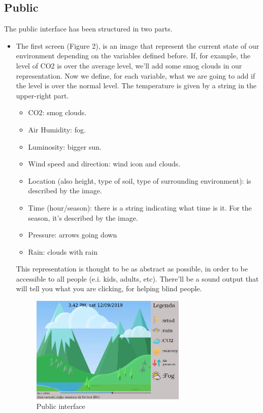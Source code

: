 \documentclass[12pt]{article} %
\begin{document}
\subsection{Public}
The public interface has been structured in two parts. 
\begin{itemize}
\item The first screen (Figure 2), is an image that represent the current state of our  environment depending on the variables defined before. If, for example, the level of CO2 is over the average level, we'll add some smog clouds in our representation. Now we define, for each variable, what we are going to add if the level is over the normal level. The temperature is given by a string in the upper-right part.
\begin{itemize}
\item CO2: smog clouds.
\item Air Humidity: fog.
\item Luminosity: bigger sun.
\item Wind speed and direction: wind icon and clouds.
\item Location (also height, type of soil, type of surrounding environment): is described by the image.
\item Time (hour/season): there is a string indicating what time is it. For the season, it's described by the image.
\item Pressure: arrows going down
\item Rain: clouds with rain
\end{itemize} 

This representation is thought to be as abstract as possible, in order to be accessible to all people (e.i. kids, adults, etc).
There'll be a sound output that will tell you what you are clicking, for helping blind people.

\begin{figure}[H]
  \centering
  \includegraphics[width=0.7\textwidth]{img/default.png}
  \caption{Public interface}
  \label{fig:boat1}
\end{figure}


\end{itemize}
\end{document}
